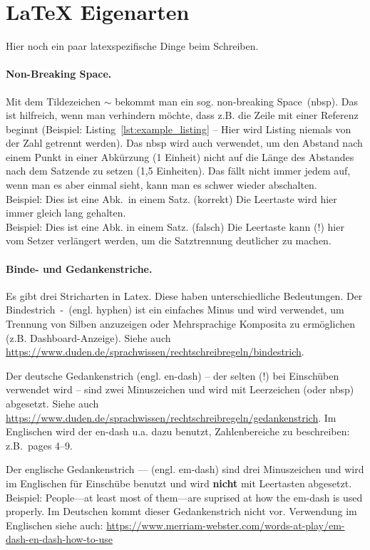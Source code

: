 

\section{LaTeX Eigenarten}
Hier noch ein paar latexspezifische Dinge beim Schreiben.

\paragraph{Non-Breaking Space.}
Mit dem Tildezeichen $\sim{}$ bekommt man ein sog. non-breaking Space~(nbsp). Das ist hilfreich, wenn man verhindern möchte, dass z.B. die Zeile mit einer Referenz beginnt (Beispiel: Listing~\ref{lst:example_listing} -- Hier wird Listing niemals von der Zahl getrennt werden).
Das nbsp wird auch verwendet, um den Abstand nach einem Punkt in einer Abkürzung (1 Einheit) nicht auf die Länge des Abstandes nach dem Satzende zu setzen (1,5 Einheiten). Das fällt nicht immer jedem auf, wenn man es aber einmal sieht, kann man es schwer wieder abschalten.\\
Beispiel: Dies ist eine Abk.~in einem Satz. (korrekt) Die Leertaste wird hier immer gleich lang gehalten.\\
Beispiel: Dies ist eine Abk. in einem Satz. (falsch) Die Leertaste kann (!) hier vom Setzer verlängert werden, um die Satztrennung deutlicher zu machen.\\

\paragraph{Binde- und Gedankenstriche.}
 Es gibt drei Stricharten in Latex. Diese haben unterschiedliche Bedeutungen.
 Der Bindestrich~-~(engl. hyphen) ist ein einfaches Minus und wird verwendet, um Trennung von Silben anzuzeigen oder Mehrsprachige Komposita zu ermöglichen (z.B. Dashboard-Anzeige). Siehe auch \url{https://www.duden.de/sprachwissen/rechtschreibregeln/bindestrich}.
 
 Der deutsche Gedankenstrich (engl. en-dash) -- der selten (!) bei Einschüben verwendet wird -- sind zwei Minuszeichen und wird mit Leerzeichen (oder nbsp) abgesetzt. Siehe auch \url{https://www.duden.de/sprachwissen/rechtschreibregeln/gedankenstrich}.
 Im Englischen wird der en-dash u.a. dazu benutzt, Zahlenbereiche zu beschreiben: z.B.~pages 4--9.

 Der englische Gedankenstrich --- (engl. em-dash) sind drei Minuszeichen und wird im Englischen für Einschübe benutzt und wird \textbf{nicht} mit Leertasten abgesetzt. Beispiel:
 People---at least most of them---are suprised at how the em-dash is used properly. Im Deutschen kommt dieser Gedankenstrich nicht vor. 
 Verwendung im Englischen siehe auch: \url{https://www.merriam-webster.com/words-at-play/em-dash-en-dash-how-to-use}

